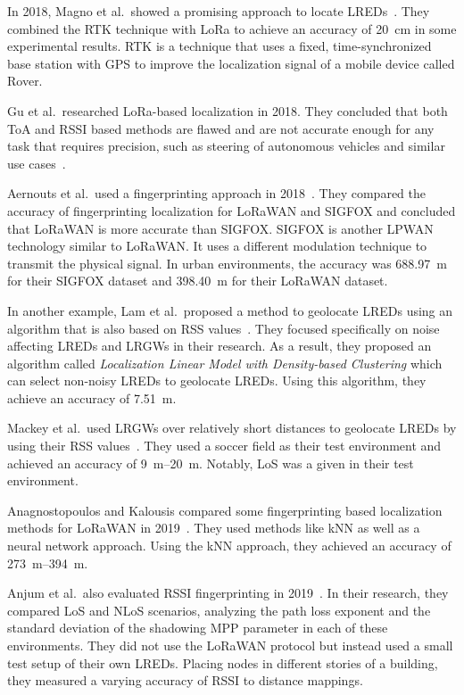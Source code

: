 In 2018, Magno et al.\ showed a promising approach to locate \aclp{LRED}~\cite{magno_poster_2018}.
They combined the \acf{RTK} technique with \ac{LoRa} to achieve an accuracy of \SI{20}{\centi\meter} in some experimental results.
\ac{RTK} is a technique that uses a fixed, time-synchronized base station with \ac{GPS} to improve the localization signal of a mobile device called Rover.

Gu et al.\ researched \ac{LoRa}-based localization in 2018.
They concluded that both \ac{ToA} and \ac{RSSI} based methods are flawed and are not accurate enough for any task that requires precision, such as steering of autonomous vehicles and similar use cases~\cite{gu_lora-based_2018}.

Aernouts et al.\ used a fingerprinting approach in 2018~\cite{aernouts_sigfox_2018}.
They compared the accuracy of fingerprinting localization for \ac{LoRaWAN} and SIGFOX and concluded that \ac{LoRaWAN} is more accurate than SIGFOX.
SIGFOX is another \ac{LPWAN} technology similar to \ac{LoRaWAN}.
It uses a different modulation technique to transmit the physical signal.
In urban environments, the accuracy was \SI{688.97}{\meter} for their SIGFOX dataset and \SI{398.40}{\meter} for their LoRaWAN dataset.

In another example, Lam et al.~proposed a method to geolocate \aclp{LRED} using an algorithm that is also based on \ac{RSS} values~\cite{lam_new_2018}.
They focused specifically on noise affecting \aclp{LRED} and \aclp{LRGW} in their research.
As a result, they proposed an algorithm called \emph{Localization Linear Model with Density-based Clustering} which can select non-noisy \aclp{LRED} to geolocate \aclp{LRED}.
Using this algorithm, they achieve an accuracy of \SI{7.51}{\meter}.

Mackey et al.~used \aclp{LRGW} over relatively short distances to geolocate \aclp{LRED} by using their \ac{RSS} values~\cite{mackey_lora-based_2019}.
They used a soccer field as their test environment and achieved an accuracy of \SIrange{9}{20}{\meter}.
Notably, \ac{LoS} was a given in their test environment.

Anagnostopoulos and Kalousis compared some fingerprinting based localization methods for \ac{LoRaWAN} in 2019~\cite{anagnostopoulos_reproducible_2019}.
They used methods like \ac{kNN} as well as a neural network approach.
Using the \ac{kNN} approach, they achieved an accuracy of \SIrange{273}{394}{\meter}.

Anjum et al.\ also evaluated \ac{RSSI} fingerprinting in 2019~\cite{anjum_analysis_2019}.
In their research, they compared \ac{LoS} and \ac{NLoS} scenarios, analyzing the path loss exponent and the standard deviation of the shadowing \ac{MPP} parameter in each of these environments.
They did not use the \ac{LoRaWAN} protocol but instead used a small test setup of their own \aclp{LRED}.
Placing nodes in different stories of a building, they measured a varying accuracy of \ac{RSSI} to distance mappings.

